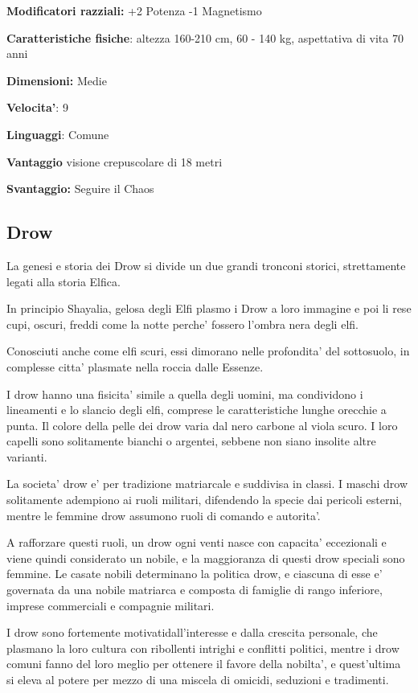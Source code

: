 \documentclass[a4paper,11pt,twoside,openany]{book}
\begin{document}
\textbf{Modificatori razziali:} +2 Potenza -1 Magnetismo

\textbf{Caratteristiche fisiche}: altezza 160-210 cm, 60 - 140 kg,
aspettativa di vita 70 anni

\textbf{Dimensioni:} Medie

\textbf{Velocita'}: 9

\textbf{Linguaggi}: Comune

\textbf{Vantaggio} visione crepuscolare di 18 metri

\textbf{Svantaggio:} Seguire il Chaos

\subsection{Drow}

\label{drow}

La genesi e storia dei Drow si divide un due grandi tronconi storici, strettamente legati alla storia Elfica.

In principio Shayalia, gelosa degli Elfi plasmo i Drow a loro immagine e poi li rese cupi, oscuri, freddi come la notte perche' fossero l'ombra nera degli elfi.

Conosciuti anche come elfi scuri, essi dimorano nelle profondita' del sottosuolo, in complesse citta' plasmate nella roccia dalle Essenze.

I drow hanno una fisicita' simile a quella degli uomini, ma condividono i lineamenti e lo slancio degli elfi, comprese le caratteristiche lunghe orecchie a punta. Il colore della pelle dei drow varia dal nero carbone al viola scuro. I loro capelli sono solitamente bianchi o argentei, sebbene non siano insolite altre varianti.

La societa' drow e' per tradizione matriarcale e suddivisa in classi. I maschi drow solitamente adempiono ai ruoli militari, difendendo la specie dai pericoli esterni, mentre le femmine drow assumono ruoli di comando e autorita'.

A rafforzare questi ruoli, un drow ogni venti nasce con capacita' eccezionali e viene quindi considerato un nobile, e la maggioranza di questi drow speciali sono femmine. Le casate nobili determinano la politica drow, e ciascuna di esse e' governata da una nobile matriarca e composta di famiglie di rango inferiore, imprese commerciali e compagnie militari.

I drow sono fortemente motivatidall'interesse e dalla crescita personale, che plasmano la loro cultura con ribollenti intrighi e conflitti politici, mentre i drow comuni fanno del loro meglio per ottenere il favore della nobilta', e quest'ultima si eleva al potere per mezzo di una miscela di omicidi, seduzioni e tradimenti.
\end{document}
